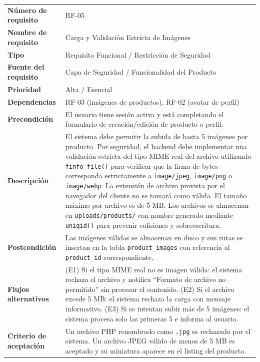 \documentclass[11pt,a4paper]{report}
\begin{document}
\begin{table}[H]
\centering
\begin{tabularx}{\textwidth}{|l|L|}
\hline
{} \\ \hline
\textbf{Número de requisito} & RF-05 \\ \hline
\textbf{Nombre de requisito} & Carga y Validación Estricta de Imágenes \\ \hline
\textbf{Tipo} & Requisito Funcional / Restricción de Seguridad \\ \hline
\textbf{Fuente del requisito} & Capa de Seguridad / Funcionalidad del Producto \\ \hline
\textbf{Prioridad} & Alta / Esencial \\ \hline
\textbf{Dependencias} & RF-03 (imágenes de productos), RF-02 (avatar de perfil) \\ \hline
\textbf{Precondición} & El usuario tiene sesión activa y está completando el formulario de creación/edición de producto o perfil. \\ \hline
\textbf{Descripción} & El sistema debe permitir la subida de hasta 5 imágenes por producto. Por seguridad, el backend debe implementar una validación estricta del tipo MIME real del archivo utilizando \texttt{finfo\_file()} para verificar que la firma de bytes corresponda estrictamente a \texttt{image/jpeg}, \texttt{image/png} o \texttt{image/webp}. La extensión de archivo provista por el navegador del cliente no se tomará como válida. El tamaño máximo por archivo es de 5 MB. Los archivos se almacenan en \texttt{uploads/products/} con nombre generado mediante \texttt{uniqid()} para prevenir colisiones y sobreescritura. \\ \hline
\textbf{Postcondición} & Las imágenes válidas se almacenan en disco y sus rutas se insertan en la tabla \texttt{product\_images} con referencia al \texttt{product\_id} correspondiente. \\ \hline
\textbf{Flujos alternativos} & (E1) Si el tipo MIME real no es imagen válida: el sistema rechaza el archivo y notifica ``Formato de archivo no permitido'' sin procesar el contenido. (E2) Si el archivo excede 5 MB: el sistema rechaza la carga con mensaje informativo. (E3) Si se intentan subir más de 5 imágenes: el sistema procesa solo las primeras 5 e informa al usuario. \\ \hline
\textbf{Criterio de aceptación} & Un archivo PHP renombrado como \texttt{.jpg} es rechazado por el sistema. Un archivo JPEG válido de menos de 5 MB es aceptado y su miniatura aparece en el listing del producto. \\ \hline
\end{tabularx}
\end{table}
\end{document}
